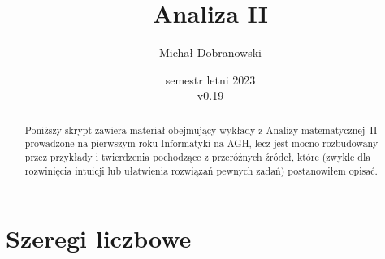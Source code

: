 \documentclass[11pt]{scrartcl}
\title{Analiza II}
\author{Michał Dobranowski}
\date{semestr letni 2023\\ v0.19}
\begin{document}
    \maketitle
    \begin{abstract}
        Poniższy skrypt zawiera materiał obejmujący wykłady z Analizy matematycznej~II prowadzone na pierwszym roku Informatyki na AGH, lecz jest mocno rozbudowany przez przykłady i twierdzenia pochodzące z przeróżnych źródeł, które (zwykle dla rozwinięcia intuicji lub ułatwienia rozwiązań pewnych zadań) postanowiłem opisać.
    \end{abstract}
    \tableofcontents
    \eject







    \section{Szeregi liczbowe}
    
\end{document}
